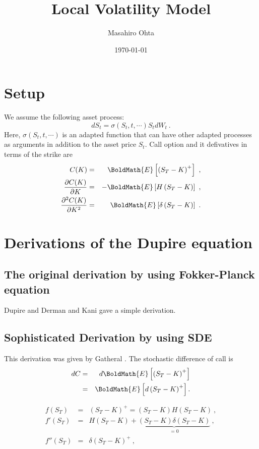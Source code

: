 \documentclass{article}
\title{Local Volatility Model}
\author{Masahiro Ohta}
\date{\today}
\begin{document}
\maketitle


\section{Setup}\label{sec:Setup}
We assume the following asset process:
\begin{equation}
	dS_t = \sigma(S_t, t, \cdots) S_t dW_t~.
\end{equation}
Here, $\sigma(S_t, t, \cdots)$ is an adapted function that can have other adapted processes as arguments in addition to the asset price $S_t$.
Call option and it defivatives in terms of the strike are
\begin{eqnarray}
	C(K) &=& \BoldMath{E}\left[\left(S_T -K\right)^+\right]~, \\
	\frac{\partial C(K)}{\partial K} &=& -\BoldMath{E}\left[H\left(S_T -K\right)\right]~,\\
	\frac{\partial^2 C(K)}{\partial K^2} &=& \BoldMath{E}\left[\delta\left(S_T -K\right)\right]~.
\end{eqnarray}

\section{Derivations of the Dupire equation}
\subsection{The original derivation by using Fokker-Planck equation}
Dupire \cite{dupire1994pricing, dupire1997pricing} and Derman and Kani \cite{derman1994riding} gave a simple derivation.
\subsection{Sophisticated Derivation by using SDE}
This derivation was given by Gatheral \cite{gatheral2011volatility}.
The stochastic difference of call is
\begin{eqnarray}
	dC &=& d\BoldMath{E}\left[ \left(S_T -K\right)^+\right] \\
		 &=&  \BoldMath{E}\left[d\left(S_T -K\right)^+\right].
\end{eqnarray}

\begin{eqnarray}
	f  (S_T) &=& (S_T -K)^+ = (S_T -K) H(S_T - K)~, \\
	f' (S_T) &=& H(S_T - K) + \underbrace{(S_T -K) \delta(S_T -K)}_{=0}~, \\
	f''(S_T) &=& \delta(S_T -K)^+~,
\end{eqnarray}
\end{document}

